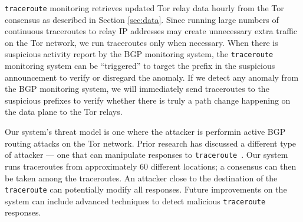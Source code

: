 {\tt traceroute} monitoring retrieves updated Tor relay data hourly from the Tor consensus as described in Section \ref{sec:data}. Since running large numbers of continuous traceroutes to relay IP addresses may create unnecessary extra traffic on the Tor network, we run traceroutes only when necessary.  When there is suspicious activity report by the BGP monitoring system, the {\tt traceroute} monitoring system can be ``triggered'' to target the prefix in the suspicious announcement to verify or disregard the anomaly. If we detect any anomaly from the BGP monitoring system, we will immediately send traceroutes to the suspicious prefixes to verify whether there is truly a path change happening on the data plane to the Tor relays. 

Our system's threat model is one where the attacker is performin active BGP routing attacks on the Tor network.  Prior research has discussed a different type of attacker --- one that can manipulate responses to {\tt traceroute}~\cite{padmanabhan2003secure}.  Our system runs traceroutes from approximately 60 different locations; a consensus can then be taken among the traceroutes.  An attacker close to the destination of the {\tt traceroute} can potentially modify all responses.  Future improvements on the system can include advanced techniques to detect malicious {\tt traceroute} responses.

